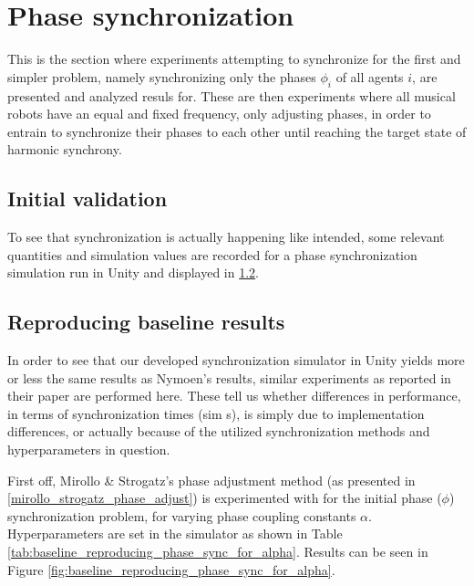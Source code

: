 



\section{Phase synchronization}
\label{sec:phase_sync}
This is the section where experiments attempting to synchronize for the first and simpler problem, namely synchronizing only the phases $\phi_i$ of all agents $i$, are presented and analyzed resuls for. These are then experiments where all musical robots have an equal and fixed frequency, only adjusting phases, in order to entrain to synchronize their phases to each other until reaching the target state of harmonic synchrony.

	\subsection{Initial validation}
	
	To see that synchronization is actually happening like intended, some relevant quantities and simulation values are recorded for a phase synchronization simulation run in Unity and displayed in \ref{}.
	
	
	\subsection{Reproducing baseline results}
	
	In order to see that our developed synchronization simulator in Unity yields more or less the same results as Nymoen's results, similar experiments as reported in their paper are performed here. These tell us whether differences in performance, in terms of synchronization times (sim s), is simply due to implementation differences, or actually because of the utilized synchronization methods and hyperparameters in question. 
	
	First off, Mirollo \& Strogatz's phase adjustment method (as presented in \ref{mirollo_strogatz_phase_adjust}) is experimented with for the initial phase ($\phi$) synchronization problem, for varying phase coupling constants $\alpha$. Hyperparameters are set in the simulator as shown in Table \ref{tab:baseline_reproducing_phase_sync_for_alpha}. Results can be seen in Figure \ref{fig:baseline_reproducing_phase_sync_for_alpha}.
	
